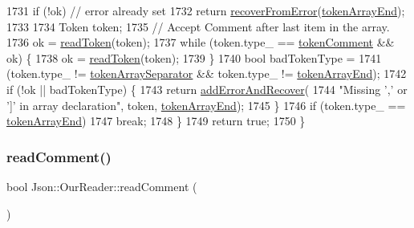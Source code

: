 \begin{DoxyCode}
1731     \textcolor{keywordflow}{if} (!ok) \textcolor{comment}{// error already set}
1732       \textcolor{keywordflow}{return} \hyperlink{class_json_1_1_our_reader_a035651f0700a76a815e5f904c63ebb1c}{recoverFromError}(\hyperlink{class_json_1_1_our_reader_a15116f7276ddf1e7a2cc3cbefa884dcca59a4f42b50d9731dce6be41818c3d91b}{tokenArrayEnd});
1733 
1734     Token token;
1735     \textcolor{comment}{// Accept Comment after last item in the array.}
1736     ok = \hyperlink{class_json_1_1_our_reader_a0d1e66da47fe2e85f5033c59326dfdc3}{readToken}(token);
1737     \textcolor{keywordflow}{while} (token.type\_ == \hyperlink{class_json_1_1_our_reader_a15116f7276ddf1e7a2cc3cbefa884dcca777fb6589fdbe225bc10a1e49a090da9}{tokenComment} && ok) \{
1738       ok = \hyperlink{class_json_1_1_our_reader_a0d1e66da47fe2e85f5033c59326dfdc3}{readToken}(token);
1739     \}
1740     \textcolor{keywordtype}{bool} badTokenType =
1741         (token.type\_ != \hyperlink{class_json_1_1_our_reader_a15116f7276ddf1e7a2cc3cbefa884dcca8ca62ab9091b149d52ec55828f8040f4}{tokenArraySeparator} && token.type\_ != 
      \hyperlink{class_json_1_1_our_reader_a15116f7276ddf1e7a2cc3cbefa884dcca59a4f42b50d9731dce6be41818c3d91b}{tokenArrayEnd});
1742     \textcolor{keywordflow}{if} (!ok || badTokenType) \{
1743       \textcolor{keywordflow}{return} \hyperlink{class_json_1_1_our_reader_a074cf3d91e9404fe89e03cfc6a43e6fb}{addErrorAndRecover}(
1744           \textcolor{stringliteral}{"Missing ',' or ']' in array declaration"}, token, \hyperlink{class_json_1_1_our_reader_a15116f7276ddf1e7a2cc3cbefa884dcca59a4f42b50d9731dce6be41818c3d91b}{tokenArrayEnd});
1745     \}
1746     \textcolor{keywordflow}{if} (token.type\_ == \hyperlink{class_json_1_1_our_reader_a15116f7276ddf1e7a2cc3cbefa884dcca59a4f42b50d9731dce6be41818c3d91b}{tokenArrayEnd})
1747       \textcolor{keywordflow}{break};
1748   \}
1749   \textcolor{keywordflow}{return} \textcolor{keyword}{true};
1750 \}
\end{DoxyCode}
\mbox{\label{class_json_1_1_our_reader_a90f6bb9e55b2bc3d6c1880809495c222}} 
\subsubsection{\texorpdfstring{read\+Comment()}{readComment()}}
{\footnotesize\ttfamily bool Json\+::\+Our\+Reader\+::read\+Comment (\begin{DoxyParamCaption}{ }\end{DoxyParamCaption})\hspace{0.3cm}{\ttfamily [private]}}



